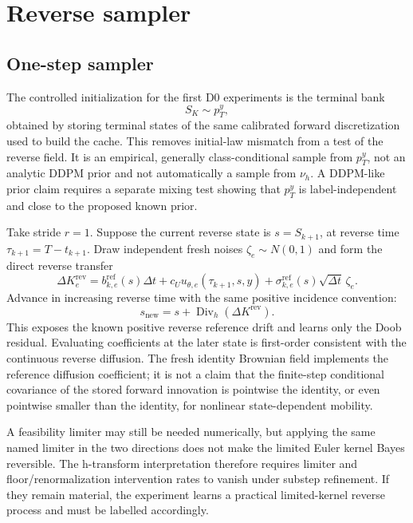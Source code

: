 \documentclass[11pt]{article}
\numberwithin{equation}{section}
\newcommand{\dive}{\operatorname{Div}_h}
\newcommand{\1}{\mathbf 1}
\begin{document}
\section{Reverse sampler}

\subsection{One-step sampler}

The controlled initialization for the first D0 experiments is the terminal bank
\begin{equation}\label{eq:prior-bank-d0}
  S_K\sim p_T^y,
\end{equation}
obtained by storing terminal states of the same calibrated forward discretization used to build the cache.  This removes initial-law mismatch from a test of the reverse field.  It is an empirical, generally class-conditional sample from \(p_T^y\), not an analytic DDPM prior and not automatically a sample from \(\nu_h\).  A DDPM-like prior claim requires a separate mixing test showing that \(p_T^y\) is label-independent and close to the proposed known prior.

Take stride \(r=1\).  Suppose the current reverse state is \(s=S_{k+1}\), at reverse time \(\tau_{k+1}=T-t_{k+1}\).  Draw independent fresh noises \(\zeta_e\sim N(0,1)\) and form the direct reverse transfer
\begin{equation}\label{eq:direct-reverse-transfer-d0}
  \Delta K_e^{\mathrm{rev}}=
  b_{k,e}^{\mathrm{ref}}(s)\Delta t
  +c_Uu_{\theta,e}(\tau_{k+1},s,y)
  +\sigma_{k,e}^{\mathrm{ref}}(s)\sqrt{\Delta t}\,\zeta_e.
\end{equation}
Advance in increasing reverse time with the same positive incidence convention:
\begin{equation}\label{eq:direct-reverse-state-update-d0}
  s_{\mathrm{new}}=s+\dive(\Delta K^{\mathrm{rev}}).
\end{equation}
This exposes the known positive reverse reference drift and learns only the Doob residual.  Evaluating coefficients at the later state is first-order consistent with the continuous reverse diffusion.  The fresh identity Brownian field implements the reference diffusion coefficient; it is not a claim that the finite-step conditional covariance of the stored forward innovation is pointwise the identity, or even pointwise smaller than the identity, for nonlinear state-dependent mobility.

A feasibility limiter may still be needed numerically, but applying the same named limiter in the two directions does not make the limited Euler kernel Bayes reversible.  The h-transform interpretation therefore requires limiter and floor/renormalization intervention rates to vanish under substep refinement.  If they remain material, the experiment learns a practical limited-kernel reverse process and must be labelled accordingly.
\end{document}
